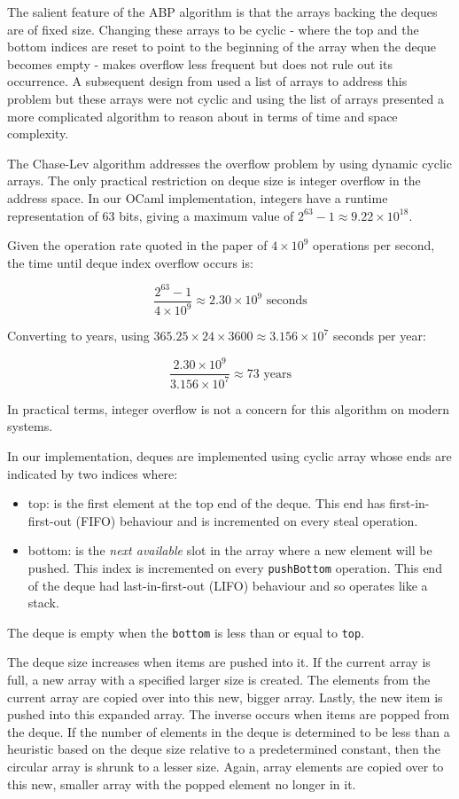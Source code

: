 \documentclass[11pt,a4paper]{article}
\begin{document}
The salient feature of the ABP algorithm is that the arrays backing the deques
are of fixed size. Changing these arrays to be cyclic - where the top and
the bottom indices are reset to point to the beginning of the array when the
deque becomes empty - makes overflow less frequent but does not rule out its
occurrence. A subsequent design from \cite{hendler2005dynamic} used a list of
arrays to address this problem but these arrays were not cyclic and using the
list of arrays presented a more complicated algorithm to reason about in
terms of time and space complexity.

The Chase-Lev algorithm addresses the overflow problem by using dynamic cyclic
arrays. The only practical restriction on deque size is integer overflow in the
address space.  In our OCaml implementation, integers have a runtime
representation of 63 bits, giving a maximum value of
$2^{63} - 1 \approx 9.22 \times 10^{18}$.

Given the operation rate quoted in the paper of $4 \times 10^{9}$ operations per second,
the time until deque index overflow occurs is:

\[
\frac{2^{63} - 1}{4 \times 10^{9}} \approx 2.30 \times 10^{9} \text{ seconds}
\]

Converting to years, using $365.25 \times 24 \times 3600 \approx 3.156 \times 10^{7}$
seconds per year:

\[
\frac{2.30 \times 10^{9}}{3.156 \times 10^{7}} \approx 73 \text{ years}
\]

In practical terms, integer overflow is not a concern for this algorithm on
modern systems.

In our implementation, deques are implemented using cyclic array whose ends are indicated by two
indices where:
\begin{itemize}[noitemsep, nosep]
    \item top: is the first element at the top end of the deque. This end has
    first-in-first-out (FIFO) behaviour and is incremented on every steal
    operation.
\item bottom: is the \emph{next available} slot in the array where a new element
    will be pushed. This index is incremented on every \texttt{pushBottom} operation.
    This end of the deque had last-in-first-out (LIFO) behaviour and so operates
    like a stack.
\end{itemize}

The deque is empty when the \texttt{bottom} is less than or equal to \texttt{top}.

The deque size increases when items are pushed into it. If the current array is
full, a new array with a specified larger size is created. The elements from the
current array are copied over into this new, bigger array. Lastly, the new item
is pushed into this expanded array. The inverse occurs when items are popped
from the deque. If the number of elements in the deque is determined to be less
than a heuristic based on the deque size relative to a predetermined constant,
then the circular array is shrunk to a lesser size. Again, array elements are
copied over to this new, smaller array with the popped element no longer in it.
\end{document}
